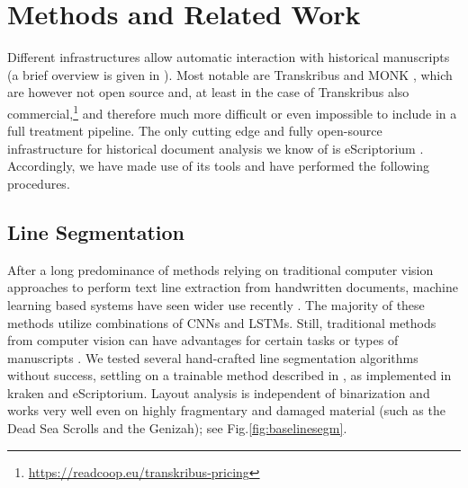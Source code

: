 \section{Methods and Related Work}

Different infrastructures allow automatic interaction with historical
manuscripts (a brief overview is given in \cite{KiesslingEtAl2019eScrip}).
Most notable are Transkribus \cite{Kahle} and MONK
\cite{schomaker2019lifelong}, which are however not open source and, at least
in the case of Transkribus also
commercial,\footnote{\url{https://readcoop.eu/transkribus-pricing}} and
therefore much more difficult or even impossible to include in a full treatment
pipeline.  The only cutting edge and fully open-source infrastructure for
historical document analysis we know of is eScriptorium \cite{escript19}.%
Accordingly, we have made use of its tools and have performed the following
procedures.

\subsection{Line Segmentation} After a long predominance of methods relying on
traditional computer vision approaches to perform text line extraction from
handwritten documents, machine learning based systems have seen wider use
recently
\cite{kiessling2019badam,gruning2018read,fink2018baseline,diem2017cbad,KurarBarakat2018}.
The majority of these methods utilize combinations of CNNs and LSTMs. Still,
traditional methods from computer vision can have advantages for certain tasks
or types of manuscripts \cite{Viral,Seuret,StoeklLapinForthcoming}.  We tested
several hand-crafted line segmentation algorithms without success, settling on
a trainable method described in \cite{kiessling2019badam,
KiesslingStoekl2019}, as implemented in kraken \cite{Kraken} and eScriptorium.
Layout analysis is independent of binarization and works very well even on
highly fragmentary and damaged material (such as the Dead Sea Scrolls and the
Genizah); see Fig.\ref{fig:baselinesegm}.

